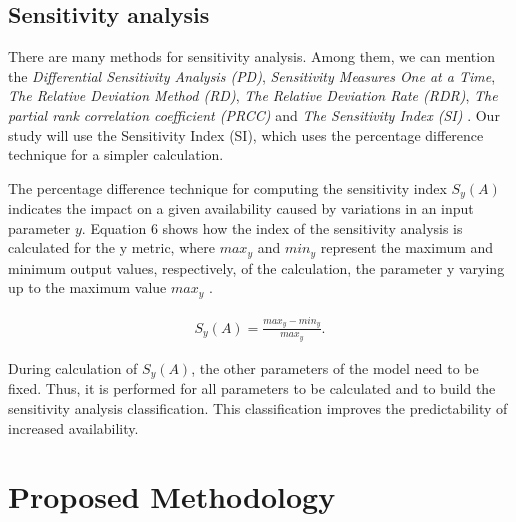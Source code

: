 \documentclass[conference]{IEEEtran}
\begin{document}
\subsection{Sensitivity analysis}

There are many methods for sensitivity analysis. Among them, we can mention the \textit{Differential Sensitivity Analysis (PD)}, \textit{Sensitivity Measures One at a Time}, \textit{The Relative Deviation Method (RD)}, \textit{The Relative Deviation Rate (RDR)}, \textit{The partial rank correlation coefficient (PRCC)} and \textit{The Sensitivity Index (SI)} \citep{hamby1995comparison}. Our study will use the Sensitivity Index (SI), which uses the percentage difference technique for a simpler calculation.

The percentage difference technique for computing the sensitivity index $S_y(A)$ indicates the impact on a given availability caused by variations in an input parameter $y$. Equation 6 shows how the index of the sensitivity analysis is calculated for the y metric, where $max_y$ and $min_y$ represent the maximum and minimum output values, respectively, of the calculation, the parameter y varying up to  the maximum value $max_y$ \citep{clemente2022availability}.

\begin{align}\label{eq:sa}
S_y(A) = \frac{max_y - min_y}{max_y}.
\end{align}

During calculation of $S_y(A)$, the other parameters of the model need to be fixed. Thus, it is performed for all parameters to be calculated and to build the sensitivity analysis classification. This classification improves the predictability of increased availability.



\section{Proposed Methodology}\label{sec:methodology}
\end{document}
